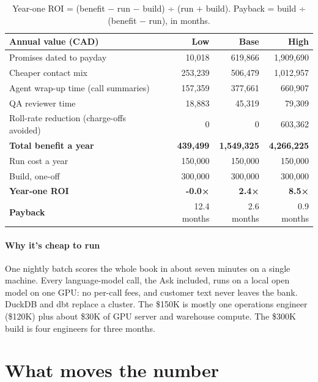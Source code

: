 \documentclass[11pt]{article}
\begin{document}
\begin{table}[htbp]\small\centering
\begin{tabular}{@{}lrrr@{}}
\toprule
\textbf{Annual value (CAD)} & \textbf{Low} & \textbf{Base} & \textbf{High} \\
\midrule
Promises dated to payday & 10,018 & 619,866 & 1,909,690 \\
Cheaper contact mix & 253,239 & 506,479 & 1,012,957 \\
Agent wrap-up time (call summaries) & 157,359 & 377,661 & 660,907 \\
QA reviewer time & 18,883 & 45,319 & 79,309 \\
Roll-rate reduction (charge-offs avoided) & 0 & 0 & 603,362 \\
\midrule
\textbf{Total benefit a year} & \textbf{439,499} & \textbf{1,549,325} & \textbf{4,266,225} \\
Run cost a year & 150,000 & 150,000 & 150,000 \\
Build, one-off & 300,000 & 300,000 & 300,000 \\
\midrule
\textbf{Year-one ROI} & \textbf{-0.0×} & \textbf{2.4×} & \textbf{8.5×} \\
\textbf{Payback} & 12.4 months & 2.6 months & 0.9 months \\
\bottomrule
\end{tabular}
\caption{Year-one ROI = (benefit − run − build) ÷ (run + build). Payback = build ÷ (benefit − run), in months.}
\end{table}

\paragraph{Why it's cheap to run} One nightly batch scores the whole book in about seven minutes on a single
machine. Every language-model call, the Ask included, runs on a local open model on one GPU: no per-call fees, and customer
text never leaves the bank. DuckDB and dbt replace a cluster. The \$150K is mostly one operations engineer (\$120K) plus
about \$30K of GPU server and warehouse compute. The \$300K build is four engineers for three months.

\section{What moves the number}

\end{document}
